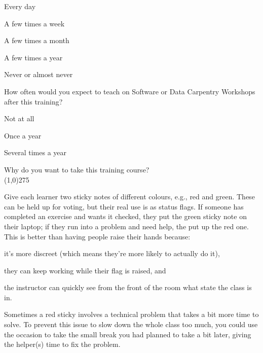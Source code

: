 \begin{genumerate}
  \begin{todolist}
  \item
    Every day
  \item
    A few times a week
  \item
    A few times a month
  \item
    A few times a year
  \item
    Never or almost never
  \end{todolist}

\item
  How often would you expect to teach on Software or Data Carpentry
  Workshops after this training?

  \begin{todolist}
  \item
    Not at all
  \item
    Once a year
  \item
    Several times a year
  \end{todolist}

\item
  Why do you want to take this training course?\\
  \line(1,0){275}

\end{genumerate}


Give each learner two sticky notes of different colours, e.g., red and
green. These can be held up for voting, but their real use is as
status flags. If someone has completed an exercise and wants it
checked, they put the green sticky note on their laptop; if they run
into a problem and need help, the put up the red one. This is better
than having people raise their hands because:

\begin{gitemize}

\item
  it's more discreet (which means they're more likely to
  actually do it),

\item
  they can keep working while their flag is raised, and

\item
  the instructor can quickly see from the front of the room what
  state the class is in.

\end{gitemize}

Sometimes a red sticky involves a technical problem that takes a bit
more time to solve. To prevent this issue to slow down the whole class
too much, you could use the occasion to take the small break you had
planned to take a bit later, giving the helper(s) time to fix the
problem.

